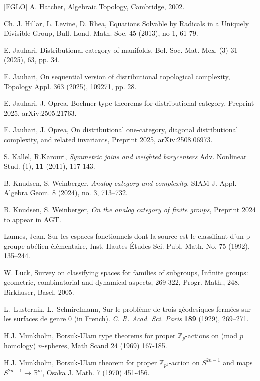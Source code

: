 \documentclass{amsart}
\numberwithin{equation}{section}
\theoremstyle{plain}
\theoremstyle{definition}
\begin{document}
\begin{thebibliography}{[FGLO]}
 A. Hatcher, Algebraic Topology, Cambridge, 2002.

 Ch. J. Hillar, L. Levine,  D. Rhea, Equations Solvable by  Radicals in a
 Uniquely Divisible Group, Bull. Lond. Math. Soc. 45 (2013), no 1, 61-79.

 E. Jauhari, Distributional category of manifolds, Bol. Soc. Mat. Mex. (3) 31 (2025), 63, pp. 34.

 E. Jauhari, On sequential version of distributional topological complexity, Topology Appl. 363 (2025), 109271, pp. 28.

 E. Jauhari, J. Oprea, Bochner-type theorems for distributional category, Preprint 2025, arXiv:2505.21763.

 E. Jauhari, J. Oprea, On distributional one-category, diagonal distributional complexity, and related invariants, Preprint 2025, arXiv:2508.06973.

 S. Kallel, R.Karouri,  {\em Symmetric joins and weighted barycenters}  Adv. Nonlinear Stud. (1), \textbf{11} (2011), 117-143.

 B. Knudsen, S. Weinberger, {\em Analog category and complexity}, SIAM J. Appl. Algebra Geom. 8 (2024), no. 3, 713–732.

 B. Knudsen, S. Weinberger, {\em On the analog category of finite groups}, Preprint 2024 to appear in AGT.

  Lannes, Jean. Sur les espaces fonctionnels dont la source est le classifiant d'un p-groupe abélien élémentaire,
Inst. Hautes Études Sci. Publ. Math. No. 75 (1992), 135–244.

  W. Luck, Survey on classifying spaces for families of subgroups, Infinite groups: geometric, combinatorial
and dynamical aspects, 269-322, Progr. Math., 248, Birkhuser, Basel, 2005.

  L.~Lusternik, L.~Schnirelmann, Sur le probl\`eme de trois g\'eodesiques ferm\'ees sur les surfaces de genre 0 (in French). \emph{C. R. Acad. Sci.  Paris} \textbf{189} (1929), 269--271.


 H.J. Munkholm, Borsuk-Ulam type theorems for proper $\mathbb Z_p$-actions on (mod $p$ homology) $n$-spheres, Math Scand 24 (1969) 167-185.

 H.J. Munkholm, Borsuk-Ulam theorem for proper $\mathbb Z_{p^k}$-action on $S^{2n-1}$ and maps $S^{2n-1}\to\mathbb R^m$, Osaka J. Math. 7
(1970) 451-456.


\end{thebibliography}
\end{document}
